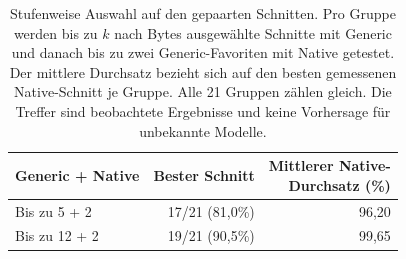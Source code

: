 \begin{table}[t]
\centering\small
\caption{Stufenweise Auswahl auf den gepaarten Schnitten. Pro Gruppe werden bis zu $k$ nach Bytes ausgewählte Schnitte mit Generic und danach bis zu zwei Generic-Favoriten mit Native getestet. Der mittlere Durchsatz bezieht sich auf den besten gemessenen Native-Schnitt je Gruppe. Alle 21 Gruppen zählen gleich. Die Treffer sind beobachtete Ergebnisse und keine Vorhersage für unbekannte Modelle.}
\label{tab:staged-budget}
\setlength{\tabcolsep}{3pt}
\begin{tabular*}{\columnwidth}{@{\extracolsep{\fill}}lrr@{}}
\toprule
Generic + Native & Bester Schnitt & \shortstack{Mittlerer Native-\\Durchsatz (\%)} \\
\midrule
Bis zu 5 + 2 & 17/21 (81,0\%) & 96,20 \\
Bis zu 12 + 2 & 19/21 (90,5\%) & 99,65 \\
\bottomrule
\end{tabular*}
\end{table}
